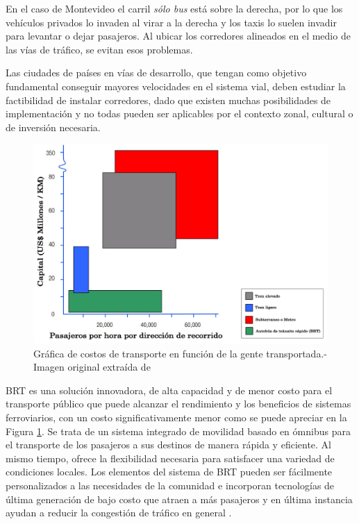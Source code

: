 En el caso de Montevideo el carril \emph{sólo bus} está sobre la derecha, por lo que los vehículos privados lo invaden al virar a la derecha y los taxis lo suelen invadir para levantar o dejar pasajeros. Al ubicar los corredores alineados en el medio de las vías de tráfico, se evitan esos problemas.  

Las ciudades de países en vías de desarrollo, que tengan como objetivo fundamental conseguir mayores velocidades en el sistema vial, deben estudiar la factibilidad de instalar corredores, dado que existen muchas posibilidades de implementación y no todas pueden ser aplicables por el contexto zonal, cultural o de inversión necesaria.

\begin{figure}[ht]
	\centering
	\includegraphics[width=0.9\linewidth]{Figures/costo_transporte}
	\caption[Gráfica de costos de transporte en función de la gente transportada.]{Gráfica de costos de transporte en función de la gente transportada.- Imagen original extraída de \citet{ITDP}		
	}
	\label{fig:Grafica de costos de otros medios de transporte}
\end{figure}

BRT es una solución innovadora, de alta capacidad y de menor costo para el transporte público que puede alcanzar el rendimiento y los beneficios de sistemas ferroviarios, con un costo significativamente menor como se puede apreciar en la Figura \ref{fig:Grafica de costos de otros medios de transporte}. Se trata de un sistema integrado de movilidad basado en ómnibus para el transporte de los pasajeros a sus destinos de manera rápida y eficiente. Al mismo tiempo, ofrece la flexibilidad necesaria para satisfacer una variedad de condiciones locales. Los elementos del sistema de BRT pueden ser fácilmente personalizados a las necesidades de la comunidad e incorporan tecnologías de última generación de bajo costo que atraen a más pasajeros y en última instancia ayudan a reducir la congestión de tráfico en general \citep{ITDP}.

